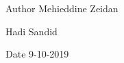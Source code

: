 \begin{DoxyAuthor}{Author}
Mehieddine Zeidan 

Hadi Sandid 
\end{DoxyAuthor}
\begin{DoxyDate}{Date}
9-\/10-\/2019 
\end{DoxyDate}
